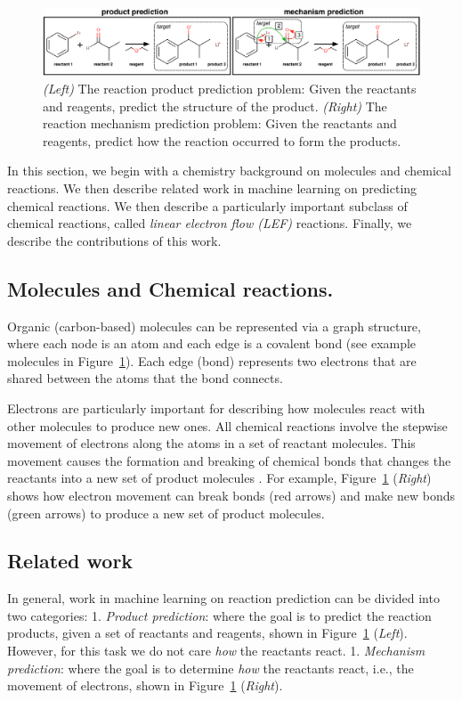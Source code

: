\begin{figure}[t!]
\centering
\includegraphics[width=\textwidth]{reaction_diagram.pdf}
\caption{\emph{(Left)} The reaction product prediction problem: Given the reactants and reagents, predict the structure of the product. \emph{(Right)} The reaction mechanism prediction problem: Given the reactants and reagents, predict how the reaction occurred to form the products.}
\label{fig:task-overview}

\end{figure}

In this section, we begin with a chemistry background on molecules and chemical reactions. We then describe related work in machine learning on predicting chemical reactions. We then describe a particularly important subclass of chemical reactions, called \emph{linear electron flow (LEF)} reactions. Finally, we describe the contributions of this work.



\subsection{Molecules and Chemical reactions.}
Organic (carbon-based) molecules can be represented via a graph structure, where each node is an atom and each edge is a covalent bond (see example molecules in Figure~\ref{fig:task-overview}).
Each edge (bond) represents two electrons that are shared between the atoms that the bond connects. 

Electrons are particularly important for describing how molecules react with other molecules to produce new ones. All chemical reactions involve the stepwise movement of electrons along the atoms in a set of reactant molecules. 
This movement causes the formation and breaking of chemical bonds that changes the reactants into a new set of product molecules \citep{herges1994coarctate}. For example, Figure~\ref{fig:task-overview} (\emph{Right}) shows how electron movement can break bonds (red arrows) and make new bonds (green arrows) to produce a new set of product molecules.

\subsection{Related work}
In general, work in machine learning on reaction prediction can be divided into two categories: 1. \emph{Product prediction}: where the goal is to predict the reaction products, given a set of reactants and reagents, shown in Figure~\ref{fig:task-overview} (\emph{Left}). However, for this task we do not care {\em how} the reactants react. 1. \emph{Mechanism prediction}: where the goal is to determine {\em how} the reactants react, i.e., the movement of electrons, shown in Figure~\ref{fig:task-overview} (\emph{Right}).


